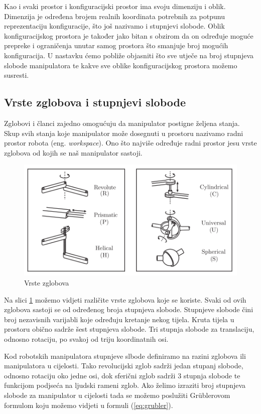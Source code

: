 \documentclass[times, utf8, diplomskirad]{fer}
\begin{document}
Kao i svaki prostor i konfiguracijski prostor ima svoju dimenziju i oblik.
Dimenzija je određena brojem realnih koordinata potrebnih za potpunu reprezentaciju konfiguracije, što još nazivamo i stupnjevi slobode.
Oblik konfiguracijskog prostora je također jako bitan s obzirom da on određuje moguće prepreke i ograničenja unutar samog prostora što smanjuje broj mogućih konfiguracija.
U nastavku ćemo pobliže objasniti što sve utječe na broj stupnjeva slobode manipulatora te kakve sve oblike konfiguracijskog prostora možemo susresti.

\hfill
\subsection{Vrste zglobova i stupnjevi slobode}
Zglobovi i članci zajedno omogućuju da manipulator postigne željena stanja.
Skup svih stanja koje manipulator može dosegnuti u prostoru nazivamo radni prostor robota (eng. \textit{workspace}).
Ono što najviše određuje radni prostor jesu vrste zglobova od kojih se naš manipulator sastoji.

\begin{figure}[H]
    \centering
    \includegraphics[width=12cm]{img/robot-joints}
    \caption{Vrste zglobova}
    \label{fig:robot-joints}
\end{figure}
Na slici \ref{fig:robot-joints} možemo vidjeti različite vrste zglobova koje se koriste.
Svaki od ovih zglobova sastoji se od određenog broja stupnjeva slobode.
Stupnjeve slobode čini broj nezavisnih varijabli koje određuju kretanje nekog tijela.
Kruta tijela u prostoru obično sadrže šest stupnjeva slobode.
Tri stupnja slobode za translaciju, odnosno rotaciju, po svakoj od triju koordinatnih osi.

Kod robotskih manipulatora stupnjeve slbode definiramo na razini zglobova ili manipulatora u cijelosti.
Tako revolucijski zglob sadrži jedan stupanj slobode, odnosno rotaciju oko jedne osi, dok sferični zglob sadrži 3 stupnja slobode te funkcijom podjseća na ljudski rameni zglob.
Ako želimo izraziti broj stupnjeva slobode za manipulator u cijelosti tada se možemo poslužiti Grüblerovom formulom koju možemo vidjeti u formuli (\ref{eq:grubler}).
\end{document}
